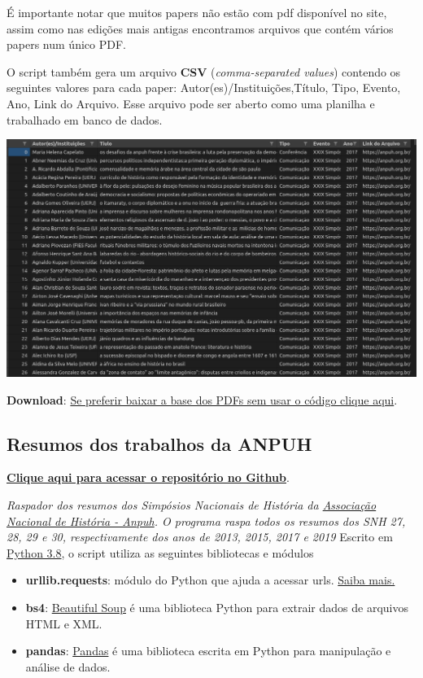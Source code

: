 \documentclass[
]{book}
\providecommand{\tightlist}{%
  \setlength{\itemsep}{0pt}\setlength{\parskip}{0pt}}
\begin{document}
É importante notar que muitos papers não estão com pdf disponível no site, assim como nas edições mais antigas encontramos arquivos que contém vários papers num único PDF.

O script também gera um arquivo \textbf{CSV} (\emph{comma-separated values}) contendo os seguintes valores para cada paper: Autor(es)/Instituições,Título, Tipo, Evento, Ano, Link do Arquivo. Esse arquivo pode ser aberto como uma planilha e trabalhado em banco de dados.

\includegraphics{img/ex_csv1.png}

\textbf{Download}: \href{https://filesender.rnp.br/?s=download\&token=9c7d390c-0033-4777-8e63-31044168c4b1}{Se preferir baixar a base dos PDFs sem usar o código clique aqui}.

\hypertarget{resumos-dos-trabalhos-da-anpuh}{%
\subsection{Resumos dos trabalhos da ANPUH}\label{resumos-dos-trabalhos-da-anpuh}}

\href{https://github.com/LABHDUFBA/anpuh-scraper}{\textbf{Clique aqui para acessar o repositório no Github}}.

\emph{Raspador dos resumos dos Simpósios Nacionais de História da \href{https://anpuh.org.br}{Associação Nacional de História - Anpuh}. O programa raspa todos os resumos dos SNH 27, 28, 29 e 30, respectivamente dos anos de 2013, 2015, 2017 e 2019}
Escrito em \href{https://www.python.org/}{Python 3.8}, o script utiliza as seguintes bibliotecas e módulos

\begin{itemize}
\tightlist
\item
  \textbf{urllib.requests}: módulo do Python que ajuda a acessar urls.
  \href{https://docs.python.org/pt-br/3/library/urllib.request.htmll}{Saiba mais.}
\item
  \textbf{bs4}: \href{https://www.crummy.com/software/BeautifulSoup/bs4/doc/}{Beautiful Soup} é uma biblioteca Python para extrair dados de arquivos HTML e XML.
\item
  \textbf{pandas}: \href{https://pandas.pydata.org/}{Pandas} é uma biblioteca escrita em Python para manipulação e análise de dados.
\end{itemize}
\end{document}
